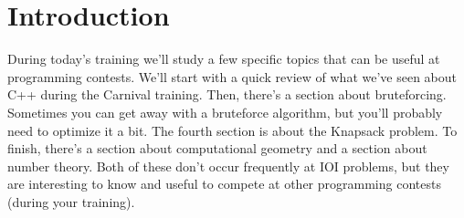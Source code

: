 \section{Introduction}
During today's training we'll study a few specific topics that can be useful at programming contests.
We'll start with a quick review of what we've seen about C++ during the Carnival training.
Then, there's a section about bruteforcing. Sometimes you can get away with a bruteforce algorithm, but you'll probably need to optimize it a bit.
The fourth section is about the Knapsack problem.
To finish, there's a section about computational geometry and a section about number theory. 
Both of these don't occur frequently at IOI problems, but they are interesting to know and useful to compete at other programming contests (during your training).